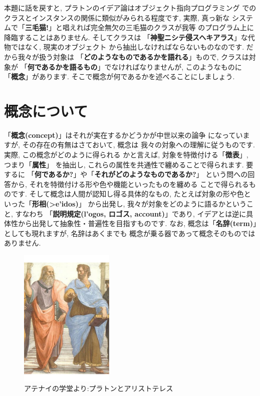 本題に話を戻すと, プラトンのイデア論はオブジェクト指向プログラミング
でのクラスとインスタンスの関係に類似がみられる程度です, 実際, 真っ新な
システムで「\textbf{三毛猫!}」と唱えれば完全無欠の三毛猫のクラスが我等
のプログラム上に降臨することはありません. そしてクラスは
「\textbf{神聖ニシテ侵スヘキアラス}」な代物ではなく, 現実のオブジェクト
から抽出しなければならないものなのです. だから我々が扱う対象は
「\textbf{どのようなものであるかを語れる}」もので, クラスは対象が
「\textbf{何であるかを語るもの}」でなければなりませんが, このようなものに
「\textbf{概念}」があります. そこで概念が何であるかを述べることにしましょう.


\section{概念について}

「\textbf{概念(concept)}」はそれが実在するかどうかが中世以来の論争
\cite{普遍論争}になっていますが, その存在の有無はさておいて, 概念は
我々の対象への理解に従うものです. 実際, この概念がどのように得られる
かと言えば, 対象を特徴付ける「\textbf{徴表}」, つまり「\textbf{属性}」
を抽出し, これらの属性を共通性で纏めることで得られます. 要するに
「\textbf{何であるか?}」や「\textbf{それがどのようなものであるか?}」
という問への回答から, それを特徴付ける形や色や機能といったものを纏める
ことで得られるものです. そして概念は人間が認知し得る具体的なもの,
 たとえば対象の形や色といった「\textbf{形相(\textgreek{>e'idos})}」
から出発し, 我々が対象をどのように語るかということ, すなわち
「\textbf{説明規定(\textgreek{l'ogos}, ロゴス, account)}」であり,
 イデアとは逆に具体性から出発して抽象性・普遍性を目指すものです. なお,
 概念は「\textbf{名辞(term)}」としても現れますが, 名辞はあくまでも
概念が乗る器であって概念そのものではありません.
\newline

\begin{figure}
\includegraphics[width=4.5cm]{Plato_and_Aristotle_in_The_School_of_Athens,_by_italian_Rafael.pdf}
\caption{アテナイの学堂より:プラトンとアリストテレス}
\label{fig:Plato-Aristotle}
\end{figure}

